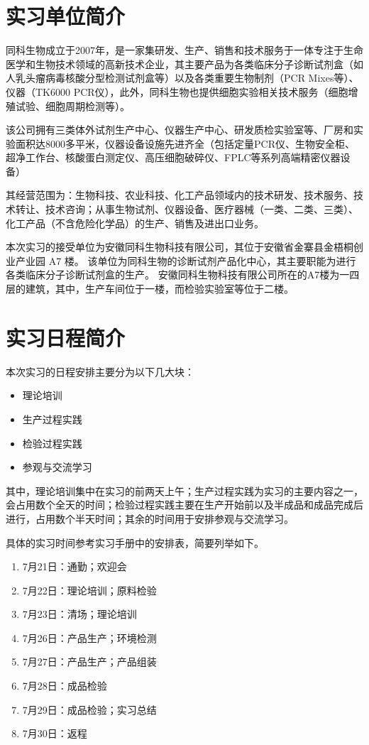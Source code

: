 \documentclass[cn,black,12pt,normal]{elegantnote}
\begin{document}
\section{实习单位简介}

同科生物成立于2007年，是一家集研发、生产、销售和技术服务于一体专注于生命医学和生物技术领域的高新技术企业，其主要产品为各类临床分子诊断试剂盒（如人乳头瘤病毒核酸分型检测试剂盒等）以及各类重要生物制剂（PCR Mixes等）、仪器（TK6000 PCR仪），此外，同科生物也提供细胞实验相关技术服务（细胞增殖试验、细胞周期检测等）。

该公司拥有三类体外试剂生产中心、仪器生产中心、研发质检实验室等、厂房和实验面积达8000多平米，仪器设备设施先进齐全（包括定量PCR仪、生物安全柜、超净工作台、核酸蛋白测定仪、高压细胞破碎仪、FPLC等系列高端精密仪器设备）

其经营范围为：生物科技、农业科技、化工产品领域内的技术研发、技术服务、技术转让、技术咨询；从事生物试剂、仪器设备、医疗器械（一类、二类、三类）、化工产品（不含危险化学品）的生产、销售及进出口业务。

本次实习的接受单位为安徽同科生物科技有限公司，其位于安徽省金寨县金梧桐创业产业园 A7 楼。
该单位为同科生物的诊断试剂产品化中心，其主要职能为进行各类临床分子诊断试剂盒的生产。
安徽同科生物科技有限公司所在的A7楼为一四层的建筑，其中，生产车间位于一楼，而检验实验室等位于二楼。


\section{实习日程简介}

本次实习的日程安排主要分为以下几大块：
\begin{itemize}
    \item 理论培训
    \item 生产过程实践
    \item 检验过程实践
    \item 参观与交流学习
\end{itemize}

其中，理论培训集中在实习的前两天上午；生产过程实践为实习的主要内容之一，会占用数个全天的时间；检验过程实践主要在生产开始前以及半成品和成品完成后进行，占用数个半天时间；其余的时间用于安排参观与交流学习。

具体的实习时间参考实习手册中的安排表，简要列举如下。

\begin{enumerate}
    \item 7月21日：通勤；欢迎会
    \item 7月22日：理论培训；原料检验
    \item 7月23日：清场；理论培训
    \item 7月26日：产品生产；环境检测
    \item 7月27日：产品生产；产品组装
    \item 7月28日：成品检验
    \item 7月29日：成品检验；实习总结
    \item 7月30日：返程
\end{enumerate}
\end{document}
